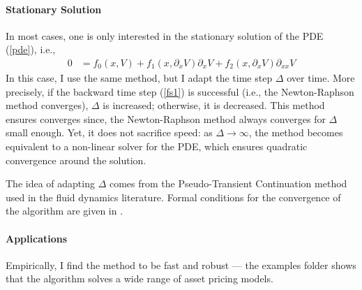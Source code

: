 \documentclass[english]{article}
\begin{document}
	\paragraph{Stationary Solution} In most cases, one is only interested in the stationary solution of the PDE (\ref{pde}), i.e.,
	\begin{align}\label{pde2}
		0&=f_0(x, V)  + f_1(x, \partial_x V) \partial_x V  + f_2(x, \partial_x V) \partial_{xx} V 
	\end{align}
	In this case, I use the same method, but I adapt the time step $\Delta$ over time. More precisely, if the backward time step (\ref{fs1}) is successful (i.e., the Newton-Raphson method converges), $\Delta$ is increased; otherwise, it is decreased. This method ensures converges since, the Newton-Raphson method always converges for $\Delta$ small enough. Yet, it does not sacrifice speed: as $\Delta \to \infty$, the method becomes equivalent to a non-linear solver for the PDE, which ensures quadratic convergence around the solution. 

	The idea of adapting $\Delta$ comes from the Pseudo-Transient Continuation method used in the fluid dynamics literature. Formal conditions for the convergence of the algorithm are given in  \citet{kelley1998convergence}. \par

	\paragraph{Applications} Empirically, I find the method to be fast and robust --- the examples folder shows that the algorithm solves a wide range of asset pricing models.
	
	
\end{document}
